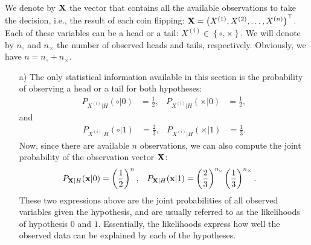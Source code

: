 \begin{solution}
	
	We denote by $\bf X$ the vector that  contains all the available observations to take the decision, i.e., the result of each coin flipping: ${\bf X} = \left( X^{(1)}, X^{(2)}, \ldots, X^{(n)}\right)^\top$. Each of these variables can be a head or a tail: $X^{(i)} \in \left\{\circ,\times \right\}$. We will denote by $n_\circ$ and $n_\times$ the number of observed heads and tails, respectively. Obviously, we have $n = n_\circ + n_\times$.
	
	\begin{itemize}
		\item [a)] The only statistical information available in this section is the probability of observing a head or a tail for both hypotheses:
		\begin{align*}
		P_{X^{(i)}|H}(\circ | 0) &= \frac{1}{2}, & P_{X^{(i)}|H}(\times | 0) &= \frac{1}{2},
		\end{align*}
		and
		\begin{align*}
		P_{X^{(i)}|H}(\circ | 1) &= \frac{2}{3}, & P_{X^{(i)}|H}(\times | 1) &= \frac{1}{3}.
		\end{align*}
		Now, since there are available $n$ observations, we can also compute the joint probability of the observation vector $\bf X$:
		\begin{align*}
		P_{{\bf X}|H}({\bf x}|0) &= \left( \frac{1}{2}\right)^{n}, & P_{{\bf X}|H}({\bf x}|1) &= \left( \frac{2}{3}\right)^{n_\circ} \left( \frac{1}{3}\right)^{n_\times}.
		\end{align*}		
		These two expressions above are the joint probabilities of all observed variables given the hypothesis, and are usually referred to as the likelihoods of hypothesis $0$ and $1$. Essentially, the likelihoods express how well the observed data can be explained by each of the hypotheses.
		

\end{itemize}
\end{solution}
